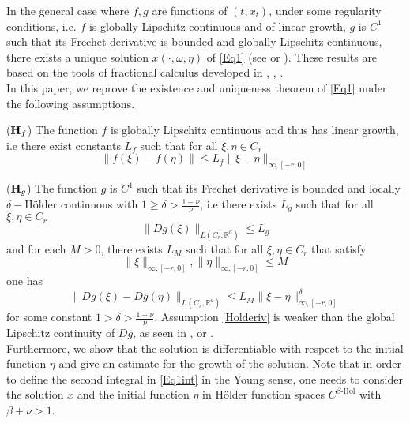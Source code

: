 \documentclass[graybox]{svmult}
\newcommand{\R}{\ensuremath{\mathbb{R}}}
\begin{document}
In the general case where $f,g$ are functions of $(t,x_t)$, under some regularity conditions, i.e. $f$ is globally Lipschitz continuous and of linear growth, $g$  is $C^1$ such that its Frechet derivative is bounded and globally Lipschitz continuous, there exists a unique solution $x(\cdot,\omega,\eta)$ of \eqref{Eq1} (see \cite{bou1} or \cite{shev}). These results are based on the tools of fractional calculus developed in \cite{nualart3}, \cite{zahle}, \cite{zahle2}. \\
In this paper, we reprove the existence and uniqueness theorem of \eqref{Eq1} under the following assumptions.

(${\textbf H}_f$) The function $f$ is globally Lipschitz continuous and thus has linear growth, i.e  there exist constants $L_f$ such that for all $\xi,\eta\in C_r$
\[
\|f(\xi)-f(\eta)\|\leq L_f\|\xi-\eta\|_{\infty,[-r,0]} 
\]

(${\textbf H}_g$) The function $g$ is $C^1$ such that its Frechet derivative is bounded and locally $\delta-$H\"older continuous with $1\geq \delta >\frac{1-\nu}{\nu}$, i.e there exists $L_g$ such that for all $\xi,\eta\in C_r$
\[
\|Dg(\xi)\|_{L(C_r,\R^d)}\leq L_g 
\]
and for each $M>0$, there exists $L_M$ such that for all $\xi,\eta\in C_r$ that satisfy 
\[
\|\xi\|_{\infty,[-r,0]},\|\eta\|_{\infty,[-r,0]}\leq M
\] 
one has
\begin{equation}\label{Holderiv}
\|Dg(\xi)- Dg(\eta)\|_{L(C_r,\R^d)}\leq L_M\|\xi-\eta\|^\delta_{\infty,[-r,0]}
\end{equation}
for some constant $1>\delta >\frac{1-\nu}{\nu}$. Assumption \eqref{Holderiv} is weaker than the global Lipschitz continuity of $Dg$, as seen in \cite{bou1}, \cite{duc-siegmund-schmalfuss} or \cite{shev}. \\
Furthermore, we show that the solution is differentiable with respect to the initial function $\eta$ and give an estimate for the growth of the solution. Note that in order to define the second integral in \eqref{Eq1int} in the Young sense, one needs to consider the solution $x$ and the initial function $\eta$ in H\"older function spaces $C^{\beta\text{-Hol}}$ with $\beta +\nu >1$. 
\end{document}
